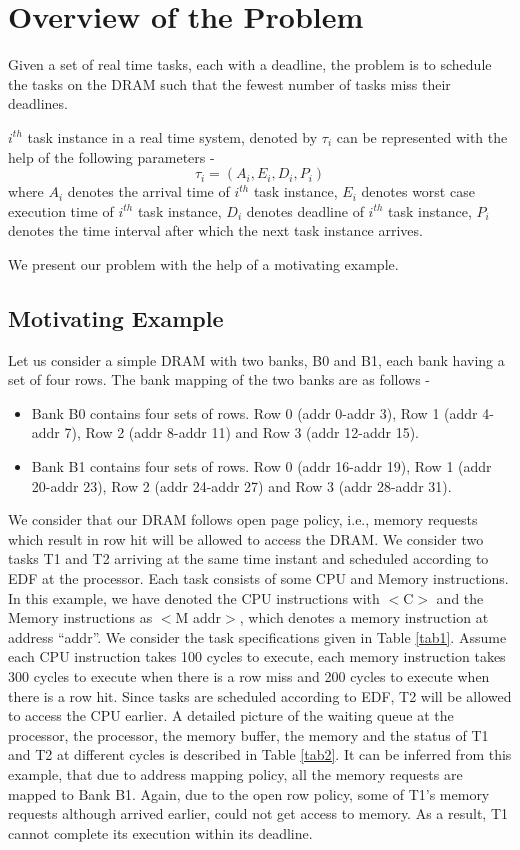 \section{Overview of the Problem}\label{mot}
\noindent
Given a set of real time tasks, each with a deadline, the problem is to schedule the tasks on the DRAM such that the fewest 
number of tasks miss their deadlines.

$i^{th}$ task instance in a real time system, denoted by $\tau_{i}$ can be represented with the help of the following 
parameters -
\[\tau_{i} = (A_{i}, E_{i}, D_{i}, P_{i})\]
where $A_{i}$ denotes the arrival time of $i^{th}$ task instance, $E_{i}$ denotes worst case execution time of $i^{th}$ task instance,
$D_{i}$ denotes deadline of $i^{th}$ task instance, $P_{i}$ denotes the time interval after which the next task instance 
arrives.

We present our problem with the help of a motivating example.
\subsection{Motivating Example}
\noindent
Let us consider a simple DRAM with two banks, B0 and B1, each bank having a set of four rows. 
The bank mapping of the two banks are as follows -
\begin{itemize}
 \item Bank B0 contains four sets of rows. Row 0 (addr 0-addr 3), Row 1 (addr 4-addr 7), Row 2 (addr 8-addr 11) and 
 Row 3 (addr 12-addr 15).
 \item Bank B1 contains four sets of rows. Row 0 (addr 16-addr 19), Row 1 (addr 20-addr 23), Row 2 (addr 24-addr 27) 
 and Row 3 (addr 28-addr 31).
\end{itemize}
We consider that our DRAM follows open page policy, i.e., memory requests which result in row hit will be allowed to access 
the DRAM. We consider two tasks T1 and T2 arriving at the same time instant and scheduled according to EDF at the processor.
Each task consists of some CPU and Memory instructions. In this example, we have denoted the CPU instructions with $<$C$>$ and 
the Memory instructions as $<$M addr$>$, which denotes a memory instruction at address ``addr''. We consider the task 
specifications given in Table \ref{tab1}. Assume each CPU instruction takes 100 cycles to execute,
each memory instruction takes 300 cycles to execute when there is a row miss and 200 cycles to execute when there is a row hit.
Since tasks are scheduled according to EDF, T2 will be allowed to access the CPU earlier. A detailed picture of the 
waiting queue at the processor, the processor, the memory buffer, the memory and the status of T1 and T2 at different
cycles is described in Table \ref{tab2}. It can be inferred from this example, that due to address mapping policy, all the 
memory requests are mapped to Bank B1. Again, due to the open row policy, some of T1's memory requests although arrived 
earlier, could not get access to memory. As a result, T1 cannot complete its execution within its deadline. 

